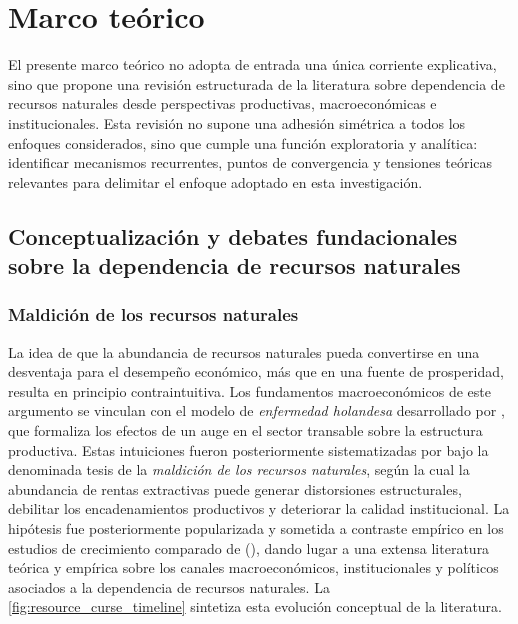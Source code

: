\documentclass[../../TFM.tex]{subfiles}
\begin{document}
	\chapter{Marco teórico}
	\label{chap:marco-teorico}
	
	
El presente marco teórico no adopta de entrada una única corriente explicativa, sino que propone una revisión estructurada de la literatura sobre dependencia de recursos naturales desde perspectivas productivas, macroeconómicas e institucionales. Esta revisión no supone una adhesión simétrica a todos los enfoques considerados, sino que cumple una función exploratoria y analítica: identificar mecanismos recurrentes, puntos de convergencia y tensiones teóricas relevantes para delimitar el enfoque adoptado en esta investigación.
	
	\section{Conceptualización y debates fundacionales sobre la dependencia de recursos naturales}
	\label{sec:conceptualizacion-debates}
	
	\subsection{Maldición de los recursos naturales}
	\label{subsec:maldicion-recursos}
	
	La idea de que la abundancia de recursos naturales pueda convertirse en una desventaja para el desempeño económico, más que en una fuente de prosperidad, resulta en principio contraintuitiva. Los fundamentos macroeconómicos de este argumento se vinculan con el modelo de \textit{enfermedad holandesa} desarrollado por \textcite{Corden1982}, que formaliza los efectos de un auge en el sector transable sobre la estructura productiva. Estas intuiciones fueron posteriormente sistematizadas por \textcite{Auty1993} bajo la denominada tesis de la \textit{maldición de los recursos naturales}, según la cual la abundancia de rentas extractivas puede generar distorsiones estructurales, debilitar los encadenamientos productivos y deteriorar la calidad institucional. La hipótesis fue posteriormente popularizada y sometida a contraste empírico en los estudios de crecimiento comparado de \citeauthor{Sachs1995} (\citeyear{Sachs1995,Sachs1997,Sachs2001}), dando lugar a una extensa literatura teórica y empírica sobre los canales macroeconómicos, institucionales y políticos asociados a la dependencia de recursos naturales. La \autoref{fig:resource_curse_timeline} sintetiza esta evolución conceptual de la literatura.
\end{document}
